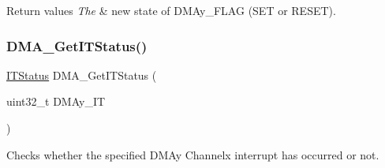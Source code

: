 \begin{DoxyRetVals}{Return values}
{\em The} & new state of D\+M\+Ay\+\_\+\+F\+L\+AG (S\+ET or R\+E\+S\+ET). \\
\hline
\end{DoxyRetVals}
\mbox{\label{group___d_m_a___private___functions_ga9287331247150fe84d03ecd7ad8adb52}} 
\subsubsection{\texorpdfstring{DMA\_GetITStatus()}{DMA\_GetITStatus()}}
{\footnotesize\ttfamily \mbox{\hyperlink{group___exported__types_gaacbd7ed539db0aacd973a0f6eca34074}{I\+T\+Status}} D\+M\+A\+\_\+\+Get\+I\+T\+Status (\begin{DoxyParamCaption}\item[{uint32\+\_\+t}]{D\+M\+Ay\+\_\+\+IT }\end{DoxyParamCaption})}



Checks whether the specified D\+M\+Ay Channelx interrupt has occurred or not. 



